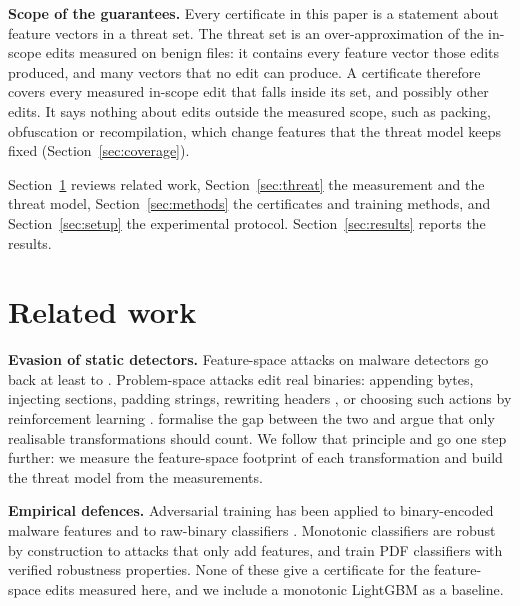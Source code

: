 \documentclass[preprint,12pt,authoryear]{elsarticle}
\begin{document}
\textbf{Scope of the guarantees.} Every certificate in this paper is a statement about feature vectors in a threat set. The threat set is an over-approximation of the in-scope edits measured on \PsNFiles{} benign files: it contains every feature vector those edits produced, and many vectors that no edit can produce. A certificate therefore covers every measured in-scope edit that falls inside its set, and possibly other edits. It says nothing about edits outside the measured scope, such as packing, obfuscation or recompilation, which change features that the threat model keeps fixed (Section~\ref{sec:coverage}).

Section~\ref{sec:related} reviews related work, Section~\ref{sec:threat} the measurement and the threat model, Section~\ref{sec:methods} the certificates and training methods, and Section~\ref{sec:setup} the experimental protocol. Section~\ref{sec:results} reports the results.

\FloatBarrier
\section{Related work}\label{sec:related}
\textbf{Evasion of static detectors.} Feature-space attacks on malware detectors go back at least to \citet{grosse2017adversarial}. Problem-space attacks edit real binaries: appending bytes, injecting sections, padding strings, rewriting headers \citep{kolosnjaji2018adversarial,demetrio2021exemples}, or choosing such actions by reinforcement learning \citep{anderson2018learning}. \citet{pierazzi2020problemspace} formalise the gap between the two and argue that only realisable transformations should count. We follow that principle and go one step further: we measure the feature-space footprint of each transformation and build the threat model from the measurements.

\textbf{Empirical defences.} Adversarial training \citep{madry2018towards} has been applied to binary-encoded malware features \citep{aldujaili2018adversarial} and to raw-binary classifiers \citep{lucas2023adversarial}. Monotonic classifiers \citep{incer2018monotonic} are robust by construction to attacks that only add features, and \citet{chen2020pdf} train PDF classifiers with verified robustness properties. None of these give a certificate for the feature-space edits measured here, and we include a monotonic LightGBM as a baseline.
\end{document}
